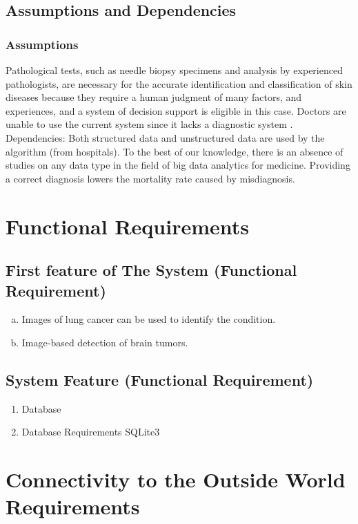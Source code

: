 \subsection{Assumptions and Dependencies}
\subsubsection{Assumptions}
  Pathological tests, such as needle biopsy specimens and analysis by experienced pathologists, are necessary for the accurate identification and classification of skin diseases because they require a human judgment of many factors, and experiences, and a system of decision support is eligible in this case. Doctors are unable to use the current system since it lacks a diagnostic system \cite{ABDELMAKSOUD201571-51}.
  Dependencies: Both structured data and unstructured data are used by the algorithm (from hospitals). To the best of our knowledge, there is an absence of studies on any data type in the field of big data analytics for medicine. Providing a correct diagnosis lowers the mortality rate caused by misdiagnosis.

\section{Functional Requirements}
\subsection{First feature of The System (Functional Requirement)}

\begin{enumerate}[a)]
    \item Images of lung cancer can be used to identify the condition.
    \item Image-based detection of brain tumors.
\end{enumerate}


\subsection{System Feature (Functional Requirement)}

\begin{enumerate}
    \item Database
    \item Database Requirements SQLite3
\end{enumerate}

\section{Connectivity to the Outside World Requirements}
